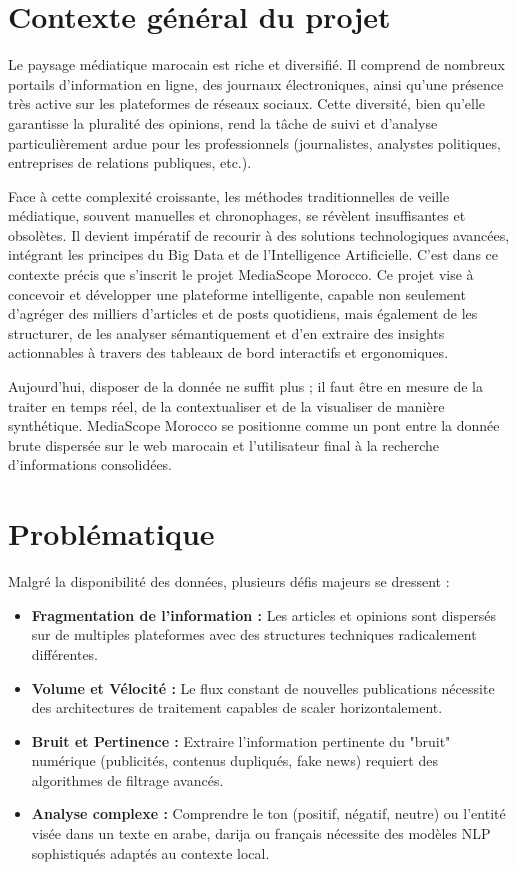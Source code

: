 \documentclass[12pt,a4paper,oneside]{report}
\newcommand{\texteContexteB}{
Face à cette complexité croissante, les méthodes traditionnelles de veille médiatique, souvent manuelles et chronophages, se révèlent insuffisantes et obsolètes. Il devient impératif de recourir à des solutions technologiques avancées, intégrant les principes du Big Data et de l'Intelligence Artificielle. C'est dans ce contexte précis que s'inscrit le projet MediaScope Morocco. Ce projet vise à concevoir et développer une plateforme intelligente, capable non seulement d'agréger des milliers d'articles et de posts quotidiens, mais également de les structurer, de les analyser sémantiquement et d'en extraire des insights actionnables à travers des tableaux de bord interactifs et ergonomiques.
}
\begin{document}
\section{Contexte général du projet}
Le paysage médiatique marocain est riche et diversifié. Il comprend de nombreux portails d'information en ligne, des journaux électroniques, ainsi qu'une présence très active sur les plateformes de réseaux sociaux. Cette diversité, bien qu'elle garantisse la pluralité des opinions, rend la tâche de suivi et d'analyse particulièrement ardue pour les professionnels (journalistes, analystes politiques, entreprises de relations publiques, etc.).

\texteContexteB

Aujourd'hui, disposer de la donnée ne suffit plus ; il faut être en mesure de la traiter en temps réel, de la contextualiser et de la visualiser de manière synthétique. MediaScope Morocco se positionne comme un pont entre la donnée brute dispersée sur le web marocain et l'utilisateur final à la recherche d'informations consolidées.

\section{Problématique}
Malgré la disponibilité des données, plusieurs défis majeurs se dressent :
\begin{itemize}[label=\textcolor{secondary}{\textbullet}, itemsep=10pt]
    \item \textbf{Fragmentation de l'information :} Les articles et opinions sont dispersés sur de multiples plateformes avec des structures techniques radicalement différentes.
    \item \textbf{Volume et Vélocité :} Le flux constant de nouvelles publications nécessite des architectures de traitement capables de scaler horizontalement.
    \item \textbf{Bruit et Pertinence :} Extraire l'information pertinente du "bruit" numérique (publicités, contenus dupliqués, fake news) requiert des algorithmes de filtrage avancés.
    \item \textbf{Analyse complexe :} Comprendre le ton (positif, négatif, neutre) ou l'entité visée dans un texte en arabe, darija ou français nécessite des modèles NLP sophistiqués adaptés au contexte local.
\end{itemize}
\end{document}
